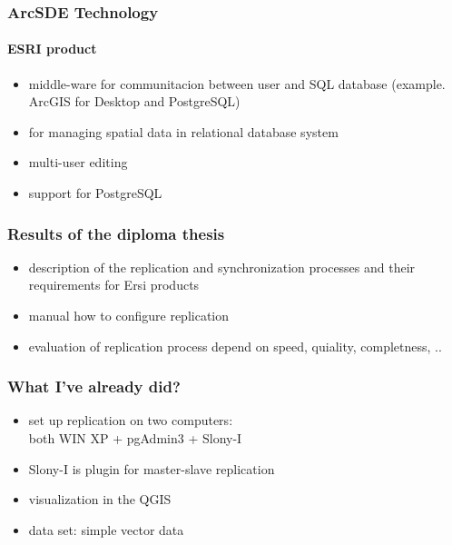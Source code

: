 \documentclass[xcolor=dvipsnames, 14pt]{beamer}
\begin{document}
  \begin{frame}
    \frametitle{ArcSDE Technology}
    \framesubtitle{ESRI product}
    \begin{itemize}
        \item middle-ware for communitacion between user and SQL database (example. ArcGIS for Desktop and PostgreSQL)
        \item for managing spatial data in relational database system
        \item multi-user editing
        \item support for PostgreSQL
    \end{itemize} 
  \end{frame}

  \begin{frame}
    \frametitle{Results of the diploma thesis}
    \begin{itemize}
      \item description of the replication and synchronization processes and their requirements for Ersi products
      \item manual how to configure replication
      \item evaluation of replication process depend on speed, quiality, completness, ..
    \end{itemize}
  \end{frame}
  
  \begin{frame}
    \frametitle{What I've already did?}
    \begin{itemize}
      \item set up replication on two computers: \\ both WIN XP + pgAdmin3 + Slony-I
      \item Slony-I is plugin for master-slave replication
      \item visualization in the QGIS
      \item data set: simple vector data 
    \end{itemize}
  \end{frame}
\end{document}
